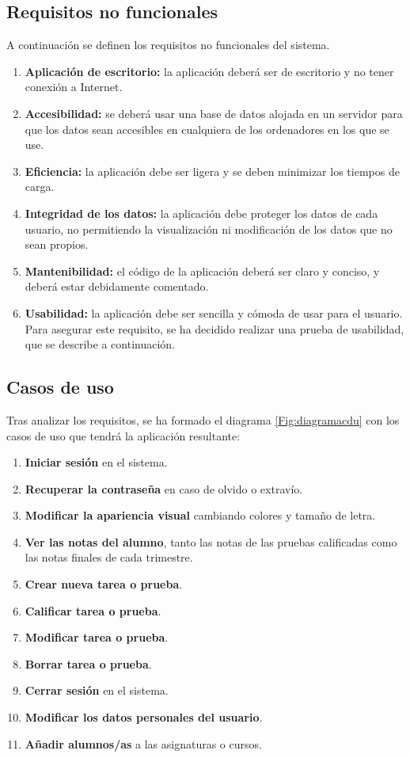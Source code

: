 \subsection{Requisitos no funcionales}
A continuación se definen los requisitos no funcionales del sistema.
\begin{enumerate}
	\item \textbf{Aplicación de escritorio:} la aplicación deberá ser de escritorio y no tener conexión a Internet.
	\item \textbf{Accesibilidad:} se deberá usar una base de datos alojada en un servidor para que los datos sean accesibles en cualquiera de los ordenadores en los que se use.
	\item \textbf{Eficiencia:} la aplicación debe ser ligera y se deben minimizar los tiempos de carga.
	\item \textbf{Integridad de los datos:} la aplicación debe proteger los datos de cada usuario, no permitiendo la visualización ni modificación de los datos que no sean propios.
	\item \textbf{Mantenibilidad:} el código de la aplicación deberá ser claro y conciso, y deberá estar debidamente comentado.
	\item \textbf{Usabilidad:} la aplicación debe ser sencilla y cómoda de usar para el usuario. Para asegurar este requisito, se ha decidido realizar una prueba de usabilidad, que se describe a continuación.
\end{enumerate}


\subsection{Casos de uso}
Tras analizar los requisitos, se ha formado el diagrama \ref{Fig:diagramacdu} con los casos de uso que tendrá la aplicación resultante:
\begin{enumerate}
	\item \textbf{Iniciar sesión} en el sistema.
	\item \textbf{Recuperar la contraseña} en caso de olvido o extravío.
	\item \textbf{Modificar la apariencia visual} cambiando colores y tamaño de letra.
	\item \textbf{Ver las notas del alumno}, tanto las notas de las pruebas calificadas como las notas finales de cada trimestre.
	\item \textbf{Crear nueva tarea o prueba}.
	\item \textbf{Calificar tarea o prueba}.
	\item \textbf{Modificar tarea o prueba}.
	\item \textbf{Borrar tarea o prueba}.
	\item \textbf{Cerrar sesión} en el sistema.
	\item \textbf{Modificar los datos personales del usuario}.
	\item \textbf{Añadir alumnos/as} a las asignaturas o cursos.
\end{enumerate}


